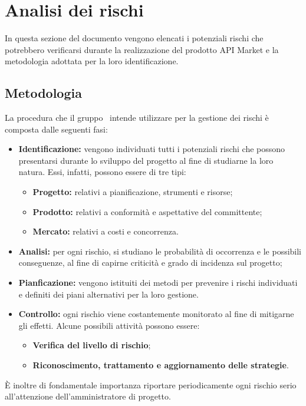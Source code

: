 \newpage
\section{Analisi dei rischi}
In questa sezione del documento vengono elencati i potenziali rischi che potrebbero verificarsi durante la realizzazione del prodotto API Market e la metodologia adottata per la loro identificazione.

\subsection{Metodologia}

La procedura che il gruppo \gruppo\ intende utilizzare per la gestione dei rischi è composta dalle seguenti fasi:
\begin{itemize}
	\item \textbf{Identificazione:} vengono individuati tutti i potenziali rischi che possono presentarsi durante lo sviluppo del progetto al fine di studiarne la loro natura. Essi, infatti, possono essere di tre tipi:
	\begin{itemize}
		\item \textbf{Progetto:} relativi a pianificazione, strumenti e risorse;
		\item \textbf{Prodotto:} relativi a conformità e aspettative del committente;
		\item \textbf{Mercato:} relativi a costi e concorrenza.
	\end{itemize}
	\item \textbf{Analisi:} per ogni rischio, si studiano le probabilità di occorrenza e le possibili conseguenze, al fine di capirne criticità e grado di incidenza sul progetto;
	\item \textbf{Pianficazione:} vengono istituiti dei metodi  per prevenire i rischi individuati e definiti dei piani alternativi per la loro gestione.
	\item \textbf{Controllo:} ogni rischio viene costantemente monitorato al fine di mitigarne gli effetti. Alcune possibili attività possono essere:
		\begin{itemize}
		\item \textbf{Verifica del livello di rischio};
		\item \textbf{Riconoscimento, trattamento e aggiornamento delle strategie}.
		\end{itemize}
	\end{itemize}
\MakeUppercase{è} inoltre di fondamentale importanza riportare periodicamente ogni rischio serio all'attenzione dell'amministratore di progetto.

